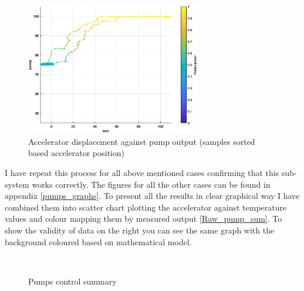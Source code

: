 \begin{figure}[h]
    \centering
    \includegraphics[height=5.8cm]{figures/pump_50_1.eps}
    \caption[Accelerator displacement against pump output]{Accelerator displacement against pump output (samples sorted based accelerator position)}
    \label{pump_50_1}
\end{figure}

I have repeat this process for all above mentioned cases confirming that this sub-system works correctly. The figures for all the other cases can be found in appendix \ref{pumps_graphs}. To present all the results in clear graphical way I have combined them into scatter chart plotting the accelerator against temperature values and colour mapping them by measured output \ref{Raw_pump_sum}. To show the validity of data on the right you can see the same graph with the background coloured based on mathematical model.

\begin{figure}[h]
    \centering
        ~
        \caption{Pumps control summary}
    \label{Pump_sum}
\end{figure}



